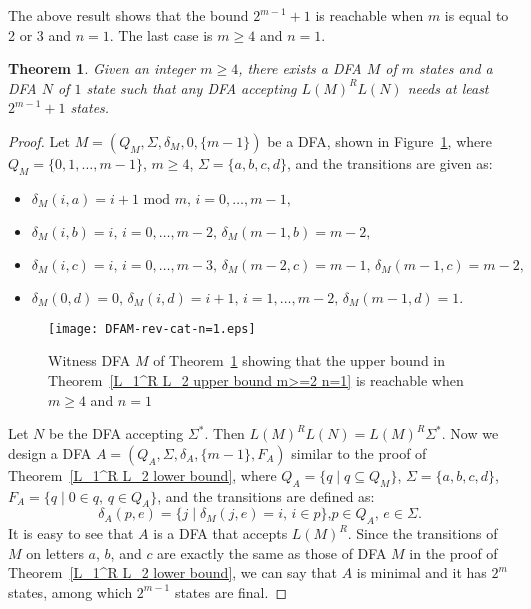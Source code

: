 \documentclass[10pt]{article}
\newtheorem{theorem}{Theorem}
\begin{document}
The above result shows that the bound $2^{m-1}+1$ is reachable when
$m$ is equal to 2 or 3 and $n = 1$. The last case is $m\ge 4$ and $n =
1$.

\begin{theorem}
\label{L_1^R L_2 lower bound m>=4 n=1} Given an integer $m\ge 4$,
there exists a DFA $M$ of $m$ states and a DFA $N$ of $1$ state such
that any DFA accepting $L(M)^R L(N)$ needs at least $2^{m-1}+1$
states.
\end{theorem}

\begin{proof}
Let $M=(Q_M,\Sigma , \delta_M , 0, \{m-1\} )$ be a DFA,
shown in Figure~\ref{DFAM-rev-cat-n=1},
where $Q_M = \{0,1,\ldots ,m-1\}$, $m\ge 4$, $\Sigma = \{a,b,c,d\}$,
and the transitions are given as:
\begin{itemize}
\item $\delta_M(i, a) = i+1 \mbox{ mod }m \mbox{, } i=0, \ldots , m-1,$
\item $\delta_M(i, b) = i \mbox{, } i=0, \ldots , m-2\mbox{, } \delta_M(m-1, b) = m-2 \mbox{, }$
\item $\delta_M(i, c) = i \mbox{, } i=0, \ldots , m-3\mbox{, } \delta_M(m-2, c) = m-1 \mbox{, } \delta_M(m-1, c) = m-2 \mbox{,}$
\item $\delta_M(0, d) = 0 \mbox{, } \delta_M(i, d) = i+1 \mbox{, } i=1, \ldots , m-2\mbox{, } \delta_M(m-1, d) = 1 \mbox{. }$
\end{itemize}
\begin{figure}[ht]
  \begin{center}
  \texttt{[image: DFAM-rev-cat-n=1.eps]}
  \end{center}
  \caption{Witness DFA $M$ of Theorem~\ref{L_1^R L_2 lower bound m>=4 n=1} showing that the upper bound in Theorem~\ref{L_1^R L_2 upper bound m>=2 n=1} is reachable when $m\ge 4$ and $n=1$}
\label{DFAM-rev-cat-n=1}
\end{figure}
Let $N$ be the DFA accepting $\Sigma^*$. Then
$L(M)^RL(N)=L(M)^R\Sigma^*$. Now we design a DFA $A=(Q_A, \Sigma ,
\delta_A , \{m-1\}, F_A)$ similar to the proof of Theorem~\ref{L_1^R
L_2 lower bound}, where $Q_A = \{q \mid q\subseteq Q_M\}$, $\Sigma =
\{a,b,c,d\}$, $F_A = \{q \mid 0\in q \mbox{, }q\in Q_A\}$, and the
transitions are defined as:
\[
\delta_A(p, e) = \{j \mid \delta_M(j, e)=i\mbox{, }i\in p\} \mbox{,
} p\in Q_A\mbox{, } e \in \Sigma.
\]
It is easy to see that $A$ is a DFA that accepts $L(M)^R$. Since the
transitions of $M$ on letters $a$, $b$, and $c$ are exactly the same
as those of DFA $M$ in the proof of Theorem~\ref{L_1^R L_2 lower
bound}, we can say that $A$ is minimal and it has $2^{m}$ states,
among which $2^{m-1}$ states are final.



\end{proof}
\end{document}
